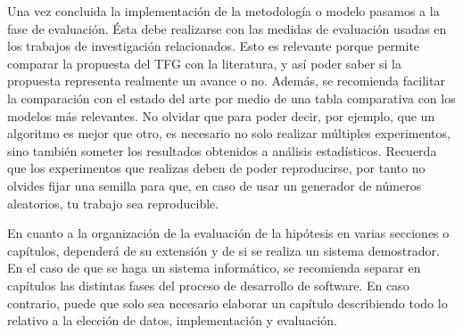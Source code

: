 Una vez concluida la implementación de la metodología o modelo pasamos a la fase de evaluación. Ésta debe realizarse con las medidas de evaluación usadas en los trabajos de investigación relacionados. Esto es relevante porque permite comparar la propuesta del TFG con la literatura, y así poder saber si la propuesta representa realmente un avance o no. Además, se recomienda facilitar la comparación con el estado del arte por medio de una tabla comparativa con los modelos más relevantes. No olvidar que para poder decir, por ejemplo, que un algoritmo es mejor que otro, es necesario no solo realizar múltiples experimentos, sino también someter los resultados obtenidos a análisis estadísticos. Recuerda que los experimentos que realizas deben de poder reproducirse, por tanto no olvides fijar una semilla para que, en caso de usar un generador de números aleatorios, tu trabajo sea reproducible.

En cuanto a la organización de la evaluación de la hipótesis en varias secciones o capítulos, dependerá de su extensión y de si se realiza un sistema demostrador. En el caso de que se haga un sistema informático, se recomienda separar en capítulos las distintas fases del proceso de desarrollo de software. En caso contrario, puede que solo sea necesario elaborar un capítulo describiendo todo lo relativo a la elección de datos, implementación y evaluación.

